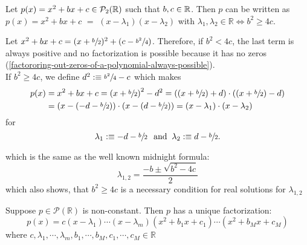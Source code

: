 \begin{thm} 
  Let $p(x)=x^2+bx+c \in \mathcal{P}_2(\mathbb{R})$ such that $b,c \in \mathbb{R}$. Then $p$ can be written as
  $p(x)=x^2 + bx + c$ $=$ $(x-\lambda_1)(x-\lambda_2)$ with $\lambda_1, \lambda_2 \in \mathbb{R} \iff b^2 \geq 4c$.
\end{thm}
\begin{prf}
  Let $x^2+bx+c=(x+\sfrac{b}{2})^2+(c-\sfrac{b^2}{4})$. Therefore, if $b^2<4c$, the last term is always positive and no factoriza\-tion is possible because it has no zeros (\ref{factororing-out-zeros-of-a-polynomial-always-possible}). \\
  If $b^2 \geq 4c$, we define $d^2 :\equiv \sfrac{b^2}{4}-c$ which makes
  \begin{equation}
	  \begin{aligned}
	    p(x)&=x^2+bx+c
		  = \left (x+\sfrac{b}{2} \right )^2-d^2
		  = \left ( (x+\sfrac{b}{2}) +d \right) \cdot \left ( (x+\sfrac{b}{2}) - d \right) \\
		  &= \left (x-(-d -\sfrac{b}{2}) \right) \cdot \left (x-(d-\sfrac{b}{2})\right)
		  =\left(x-\lambda_1 \right) \cdot \left(x-\lambda_2\right)
	  \end{aligned}
  \end{equation}
  for 
  \begin{equation}
    \lambda_1 :\equiv -d-\sfrac{b}{2} \;\;\, \text{and}\;\; \lambda_2 :\equiv d-\sfrac{b}{2}.
  \end{equation}
  
  which is the same as the well known midnight formula:
  \begin{equation}
    \lambda_{1,2} = \frac{-b \pm \sqrt{b^2-4c}}{2}
  \end{equation}
  which also shows, that $b^2 \geq 4c$ is a necessary condition for real solutions for $\lambda_{1,2}$
  
\end{prf}

\begin{thm}
  Suppose $p \in \mathcal{P}(\mathbb{R})$ is non-constant. Then $p$ has a unique factorization:
  \begin{equation}
    p(x) = c(x-\lambda_1) \cdots (x-\lambda_m)(x^2+b_1x+c_1) \cdots (x^2+b_Mx+c_M)
  \end{equation}
  where $c, \lambda_1, \cdots, \lambda_m, b_1, \cdots, b_M, c_1, \cdots, c_M \in \mathbb{R}$
\end{thm}

